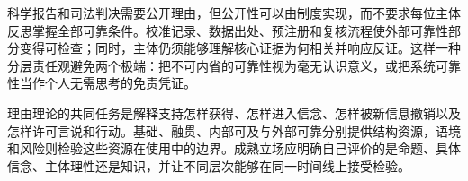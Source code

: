 科学报告和司法判决需要公开理由，但公开性可以由制度实现，而不要求每位主体反思掌握全部可靠条件。校准记录、数据出处、预注册和复核流程使外部可靠性部分变得可检查；同时，主体仍须能够理解核心证据为何相关并响应反证。这样一种分层责任观避免两个极端：把不可内省的可靠性视为毫无认识意义，或把系统可靠性当作个人无需思考的免责凭证。

理由理论的共同任务是解释支持怎样获得、怎样进入信念、怎样被新信息撤销以及怎样许可言说和行动。基础、融贯、内部可及与外部可靠分别提供结构资源，语境和风险则检验这些资源在使用中的边界。成熟立场应明确自己评价的是命题、具体信念、主体理性还是知识，并让不同层次能够在同一时间线上接受检验。
